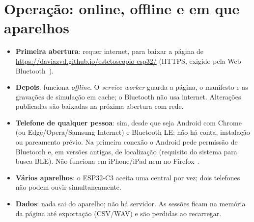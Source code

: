 \documentclass[conference,a4paper]{IEEEtran}
\begin{document}
\section{Operação: online, offline e em que aparelhos}
\label{sec:oper}
\begin{itemize}[leftmargin=*]
\item \textbf{Primeira abertura}: requer internet, para baixar a página de \url{https://daviazvd.github.io/estetoscopio-esp32/} (HTTPS, exigido pela Web Bluetooth~\cite{mdn-wb}).
\item \textbf{Depois}: funciona \emph{offline}. O \emph{service worker} guarda a página, o manifesto e as gravações de simulação em cache; o Bluetooth não usa internet. Alterações publicadas são baixadas na próxima abertura com rede.
\item \textbf{Telefone de qualquer pessoa}: sim, desde que seja Android com Chrome (ou Edge/Opera/Samsung Internet) e Bluetooth LE; não há conta, instalação ou pareamento prévio. Na primeira conexão o Android pede permissão de Bluetooth e, em versões antigas, de localização (requisito do sistema para busca BLE). Não funciona em iPhone/iPad nem no Firefox~\cite{mdn-wb}.
\item \textbf{Vários aparelhos}: o ESP32-C3 aceita uma central por vez; dois telefones não podem ouvir simultaneamente.
\item \textbf{Dados}: nada sai do aparelho; não há servidor. As sessões ficam na memória da página até exportação (CSV/WAV) e são perdidas ao recarregar.
\end{itemize}
\end{document}
